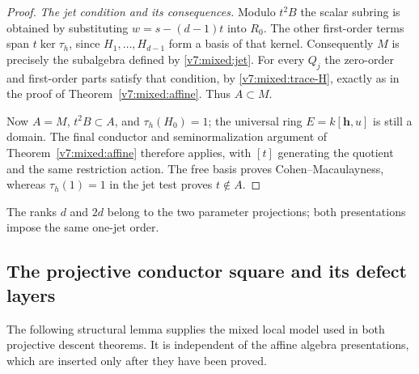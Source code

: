 \documentclass[10pt,fleqn]{article}
\numberwithin{equation}{section}
\begin{document}
\begin{proof}
\textit{The jet condition and its consequences.}
Modulo $t^2B$ the scalar subring is obtained by substituting
$w=s-(d-1)t$ into $R_0$.  The other first-order terms span
$t\ker\tau_h$, since $H_1,\ldots,H_{d-1}$ form a basis of that kernel.
Consequently $M$ is precisely the subalgebra defined by
\eqref{v7:mixed:jet}.  For every $Q_j$ the zero-order and first-order
parts satisfy that condition, by \eqref{v7:mixed:trace-H}, exactly as
in the proof of Theorem~\ref{v7:mixed:affine}.  Thus $A\subset M$.

Now $A=M$, $t^2B\subset A$, and $\tau_h(H_0)=1$; the universal
ring $E=k[\mathbf h,u]$ is still a domain.  The final conductor and
seminormalization argument of Theorem~\ref{v7:mixed:affine} therefore
applies, with $[t]$ generating the quotient and the same restriction
action.  The free basis proves Cohen--Macaulayness, whereas
$\tau_h(1)=1$ in the jet test proves $t\notin A$.
\end{proof}

The ranks $d$ and $2d$ belong to the two parameter projections;
both presentations impose the same one-jet order.

\subsection{The projective conductor square and its defect layers}
\label{r22:mixed:projective-route}

The following structural lemma supplies the mixed local model used in
both projective descent theorems.  It is independent of the affine
algebra presentations, which are inserted only after they have been proved.
\end{document}
